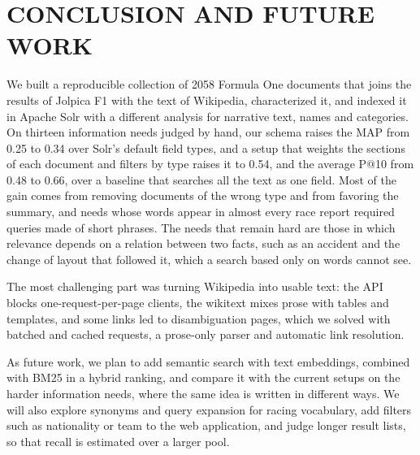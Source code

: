 \documentclass[sigconf]{acmart}
\begin{document}
\section{CONCLUSION AND FUTURE WORK}
\label{sec:conclusions}
We built a reproducible collection of 2058 Formula One documents that joins
the results of Jolpica F1 with the text of Wikipedia, characterized it, and
indexed it in Apache Solr with a different analysis for narrative text, names
and categories. On thirteen information needs judged by hand, our schema
raises the MAP from 0.25 to 0.34 over Solr's default field types, and a setup
that weights the sections of each document and filters by type raises it to
0.54, and the average P@10 from 0.48 to 0.66, over a baseline that searches
all the text as one field. Most of the gain comes from removing
documents of the wrong type and from favoring the summary, and needs whose
words appear in almost every race report required queries made of short
phrases. The needs that remain hard are those in which relevance
depends on a relation between two facts, such as an accident and the change
of layout that followed it, which a search based only on words cannot see.

The most challenging part was turning Wikipedia into usable text: the API
blocks one-request-per-page clients, the wikitext mixes prose with tables
and templates, and some links led to disambiguation pages, which we solved
with batched and cached requests, a prose-only parser and automatic link
resolution.

As future work, we plan to add semantic search with text embeddings,
combined with BM25 in a hybrid ranking, and compare it with the current
setups on the harder information needs, where the same idea is written in
different ways. We will also explore synonyms and query expansion for racing
vocabulary, add filters such as nationality or team to the web application,
and judge longer result lists, so that recall is estimated over a larger
pool.
\end{document}
